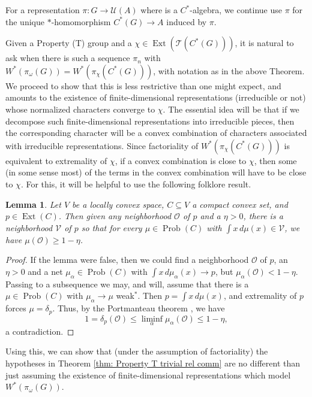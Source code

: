 \documentclass[10pt]{amsart}
\newtheorem{lem}[thm]{Lemma}
\theoremstyle{definition}
\numberwithin{equation}{section}
\newcommand{\cT}{{\mathcal T}}
\newcommand{\cU}{{\mathcal U}}
\DeclareMathOperator{\Ext}{Ext}
\DeclareMathOperator{\Prob}{Prob}
\begin{document}
For a representation $\pi\colon G\to \cU(A)$ where is a $C^{*}$-algebra, we continue use $\pi$ for the unique $*$-homomorphism $C^{*}(G)\to A$ induced by $\pi$. 

Given a Property (T) group and a $\chi\in \Ext(\cT(C^{*}(G)))$, it is natural to ask when there is such a sequence $\pi_{n}$ with $W^{*}(\pi_{\omega}(G))=W^{*}(\pi_{\chi}(C^{*}(G)))$, with notation as in the above Theorem.  We proceed to show that this is less restrictive than one might expect, and amounts to the existence of finite-dimensional representations (irreducible or not) whose normalized characters converge to $\chi$. The essential idea will be that if we decompose such finite-dimensional representations into irreducible pieces, then the corresponding character will be a convex combination of characters associated with irreducible representations. Since factoriality of $W^{*}(\pi_{\chi}(C^{*}(G)))$ is equivalent to extremality of $\chi$, if a convex combination is close to $\chi$, then some (in some sense most) of the terms in the convex combination will have to be close to $\chi$. 
For this, it will be helpful to use the following folklore result.

\begin{lem}\label{lem: perturb extremality}
Let $V$ be a locally convex space, $C\subseteq V$ a compact convex set, and $p\in \Ext(C)$. Then given any neighborhood $\mathcal{O}$ of $p$ and a $\eta>0$, there is a neighborhood $\mathcal{V}$ of $p$ so that for every $\mu\in \Prob(C)$ with $\int x\,d\mu(x)\in \mathcal{V}$, we have $\mu(\mathcal{O})\geq 1-\eta$.       
\end{lem}

\begin{proof}
If the lemma were false, then we could find a neighborhood $\mathcal{O}$ of $p$, an $\eta>0$ and a net $\mu_{\alpha}\in \Prob(C)$ with $\int x\,d\mu_{\alpha}(x)\to p$, but $\mu_{\alpha}(\mathcal{O})<1-\eta$. Passing to a subsequence we may, and will, assume that there is a $\mu\in \Prob(C)$ with $\mu_{\alpha}\to\mu$ weak$^{*}$. Then $p=\int x\,d\mu(x)$, and extremality of $p$ forces $\mu=\delta_{p}$. Thus, by the Portmanteau theorem \cite[Theorem 11.1.1]{DudleyProb}, we have 
\[1=\delta_{p}(\mathcal{O})\leq \liminf_{\alpha}\mu_{\alpha}(\mathcal{O})\leq 1-\eta,\]
a contradiction. 



\end{proof}

Using this, we can show that (under the assumption of factoriality) the hypotheses in Theorem \ref{thm: Property T trivial rel comm} are no different than just assuming the existence of finite-dimensional representations which model $W^{*}(\pi_{\omega}(G)).$
\end{document}
